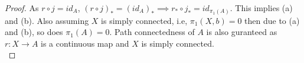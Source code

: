 \documentclass[paper=a4, fontsize=11pt]{scrartcl}
\begin{document}
\begin{proof}
	As $r \circ j = id_A$, $(r \circ j)_* = (id_A)_* \implies r_* \circ j_* = id_{\pi_1(A)}$. This implies (a) and (b). Also assuming $X$ is simply connected, i.e, $\pi_1(X,b) = 0$ then due to (a) and (b), so does $\pi_1(A) = 0$. Path connectedness of $A$ is also guranteed as $r:X\to A$ is a continuous map and $X$ is simply connected.\\
\end{proof}
\end{document}
